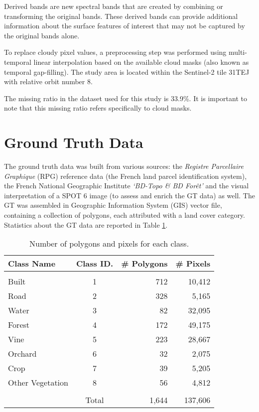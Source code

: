 Derived bands are new spectral bands that are created by combining or transforming the original bands.
These derived bands can provide additional information about the surface features of interest that may not be captured by the original bands alone.



To replace cloudy pixel values, a preprocessing step was performed using multi-temporal linear interpolation based on the available cloud masks (also known as temporal gap-filling\cite{IENCO201911}).
The study area is located within the Sentinel-2 tile 31TEJ with relative orbit number 8.

The missing ratio in the dataset used for this study is 33.9\%. It is important to note that this missing ratio refers specifically to cloud masks.

\section{Ground Truth Data}

The ground truth data was built from various sources: the \textit{Registre Parcellaire Graphique} (RPG) reference data (the French land parcel identification system), the French National Geographic Institute \textit{‘BD-Topo \& BD Forêt’} and the visual interpretation of a SPOT 6 image (to assess and enrich the GT data) as well. 
The GT was assembled in Geographic Information System (GIS) vector file, containing a collection of polygons, each attributed with a land cover category. 
Statistics about the GT data are reported in Table \ref{tab:gt}.

\begin{table}[H]
\centering
\begin{tabular}{lcrr}
  Class Name & Class ID. & \# Polygons & \# Pixels \\[0.2cm]\hline \\[-0.2cm] 
  Built & 1 & 712 & 10,412\\
  Road  & 2 & 328 & 5,165\\
  Water & 3 & 82 & 32,095\\
  Forest  & 4 & 172 & 49,175\\
  Vine  & 5 & 223 & 28,667\\
  Orchard & 6 & 32 & 2,075\\
  Crop  & 7 & 39 & 5,205\\
  Other Vegetation & 8  & 56 & 4,812 \\[0.2cm]\hline \\[-0.2cm] 
  & Total & 1,644 & 137,606
\end{tabular}
\caption{Number of polygons and pixels for each class.}
\label{tab:gt}
\end{table}


